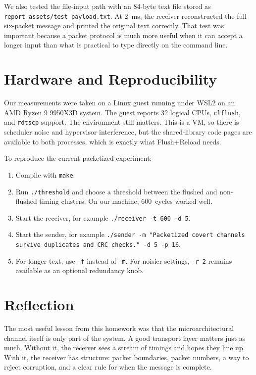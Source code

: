\documentclass[11pt]{article}
\begin{document}
We also tested the file-input path with an 84-byte text file stored as \texttt{report\_assets/test\_payload.txt}. At \SI{2}{ms}, the receiver reconstructed the full six-packet message and printed the original text correctly. That test was important because a packet protocol is much more useful when it can accept a longer input than what is practical to type directly on the command line.

\section{Hardware and Reproducibility}
Our measurements were taken on a Linux guest running under WSL2 on an AMD Ryzen 9 9950X3D system. The guest reports 32 logical CPUs, \texttt{clflush}, and \texttt{rdtscp} support. The environment still matters. This is a VM, so there is scheduler noise and hypervisor interference, but the shared-library code pages are available to both processes, which is exactly what Flush+Reload needs.

To reproduce the current packetized experiment:

\begin{enumerate}
    \item Compile with \texttt{make}.
    \item Run \texttt{./threshold} and choose a threshold between the flushed and non-flushed timing clusters. On our machine, \SI{600}{cycles} worked well.
    \item Start the receiver, for example \texttt{./receiver -t 600 -d 5}.
    \item Start the sender, for example \texttt{./sender -m "Packetized covert channels survive duplicates and CRC checks." -d 5 -p 16}.
    \item For longer text, use \texttt{-f} instead of \texttt{-m}. For noisier settings, \texttt{-r 2} remains available as an optional redundancy knob.
\end{enumerate}

\section{Reflection}
The most useful lesson from this homework was that the microarchitectural channel itself is only part of the system. A good transport layer matters just as much. Without it, the receiver sees a stream of timings and hopes they line up. With it, the receiver has structure: packet boundaries, packet numbers, a way to reject corruption, and a clear rule for when the message is complete.
\end{document}
